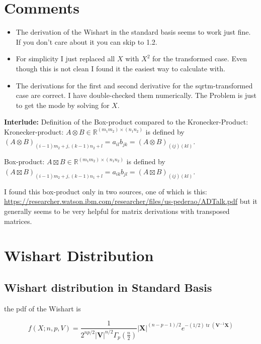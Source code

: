 \documentclass{article}
\author{%
  Marius Hobbhahn \\
  Department of Computer Science\\
  University of Tübingen\\
  Tübingen, Germany \\
  \texttt{marius.hobbhahn@gmail.com} \\
}
\begin{document}
\section*{Comments}

\begin{itemize}
	\item The derivation of the Wishart in the standard basis seems to work just fine. If you don't care about it you can skip to 1.2. 
	\item For simplicity I just replaced all $X$ with $X^2$ for the transformed case. Even though this is not clean I found it the easiest way to calculate with. 
	\item The derivations for the first and second derivative for the sqrtm-transformed case are correct. I have double-checked them numerically. The Problem is just to get the mode by solving for $X$. 
\end{itemize}

\textbf{Interlude:} Definition of the Box-product compared to the Kronecker-Product: \\

Kronecker-product: $A \otimes B \in \mathbb{R}^{(m_1m_2) \times (n_1n_2)}$ is defined by $(A \otimes B)_{(i - 1)m_2+j,(k - 1)n_2+l} = a_{il}b_{jk} = (A \otimes B)_{(ij)(kl)}$.

Box-product: $A \boxtimes B \in \mathbb{R}^{(m_1m_2) \times (n_1n_2)}$ is defined by $(A \boxtimes B)_{(i - 1)m_2+j,(k - 1)n_1+l} = a_{ik}b_{jl} = (A \boxtimes B)_{(ij)(kl)}$.

I found this box-product only in two sources, one of which is this: \url{https://researcher.watson.ibm.com/researcher/files/us-pederao/ADTalk.pdf} but it generally seems to be very helpful for matrix derivations with transposed matrices.

\section{Wishart Distribution}

\subsection{Wishart distribution in Standard Basis}

the pdf of the Wishart is

\begin{equation}
f(X; n,p,V) = \frac{1}{2^{np/2} \left|{\mathbf V}\right|^{n/2} \Gamma_p\left(\frac {n}{2}\right ) }{\left|\mathbf{X}\right|}^{(n-p-1)/2} e^{-(1/2)\operatorname{tr}({\mathbf V}^{-1}\mathbf{X})}
\label{eq:wishart_pdf}
\end{equation}
\end{document}
